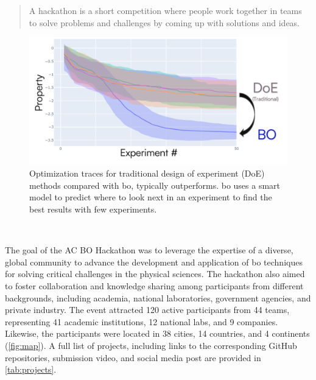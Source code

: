 \documentclass[superscriptaddress, nofootinbib,  amsmath, amssymb, twocolumn]{revtex4-2} %
\let\originalcite\cite
\renewcommand{\cite}[1]{\unskip~\originalcite{#1}}
\begin{document}
\begin{quote}
A hackathon is a short competition where people work together in teams to solve problems and challenges by coming up with solutions and ideas.
\end{quote}

\begin{figure}
    \centering
    \includegraphics[width=1\linewidth]{latex/figures/intro-bo.png}
    \caption{Optimization traces for traditional design of experiment (DoE) methods compared with \gls{bo}, typically outperforms. \Gls{bo} uses a smart model to predict where to look next in an experiment to find the best results with few experiments.}
    \label{fig:intro-bo}
\end{figure}


\cite{saarLowCostRobotScience2022}

The goal of the AC BO Hackathon was to leverage the expertise of a diverse, global community to advance the development and application of \gls{bo} techniques for solving critical challenges in the physical sciences. The hackathon also aimed to foster collaboration and knowledge sharing among participants from different backgrounds, including academia, national laboratories, government agencies, and private industry. The event attracted 120 active participants from 44 teams, representing 41 academic institutions, 12 national labs, and 9 companies. Likewise, the participants were located in 38 cities, 14 countries, and 4 continents (\cref{fig:map}). A full list of projects, including links to the corresponding GitHub repositories, submission video, and social media post are provided in \cref{tab:projects}.

\end{document}
